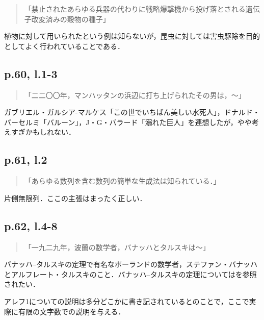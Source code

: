 \documentclass[10pt, a5paper, twoside]{jsarticle}
\theoremstyle{definition}
\begin{document}
			\begin{quote}

				「禁止されたあらゆる兵器の代わりに戦略爆撃機から投げ落とされる遺伝子改変済みの穀物の種子」
				
			\end{quote}

			植物に対して用いられたという例は知らないが，昆虫に対しては害虫駆除を目的としてよく行われていることである\cite{htk}．

		\subsection{p.60, l.1-3}

			\begin{quote}

				「二二〇〇年，マンハッタンの浜辺に打ち上げられたその男は，〜」
				
			\end{quote}

				ガブリエル・ガルシア-マルケス「この世でいちばん美しい水死人」，ドナルド・バーセルミ「バルーン」，J・G・バラード「溺れた巨人」を連想したが，やや考えすぎかもしれない．

		\subsection{p.61, l.2}

			\begin{quote}

				「あらゆる数列を含む数列の簡単な生成法は知られている．」
				
			\end{quote}

			片側無限列．ここの主張はまったく正しい．

		\subsection{p.62, l.4-8}

			\begin{quote}

				「一九二九年，波蘭の数学者，バナッハとタルスキは〜」
				
			\end{quote}

			バナッハ--タルスキの定理で有名なポーランドの数学者，ステファン・バナッハとアルフレート・タルスキのこと．バナッハ--タルスキの定理については\cite{mjk}を参照されたい．

			アレフ1についての説明は多分どこかに書き記されているとのことで，ここで実際に有限の文字数での説明を与える．
\end{document}
